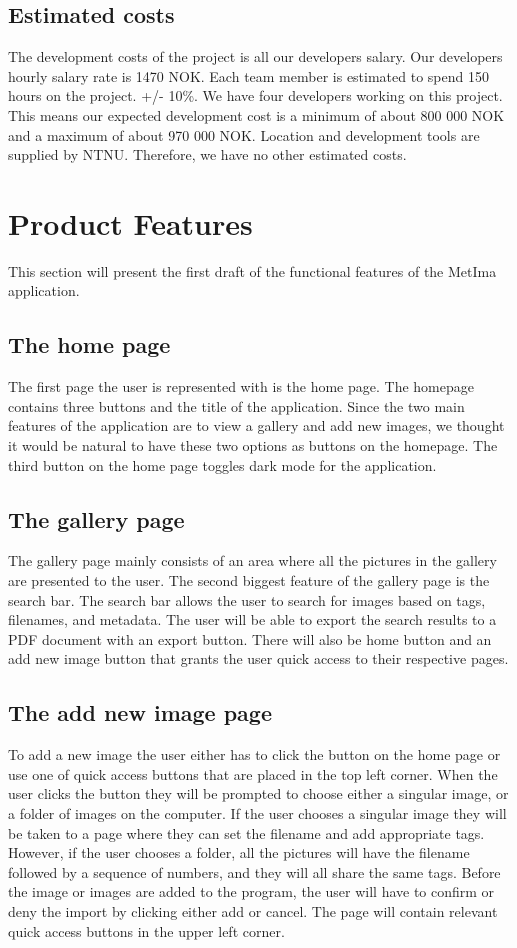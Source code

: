 \documentclass{article}
\begin{document}
\subsection{Estimated costs}
The development costs of the project is all our developers salary. Our developers hourly salary rate is 1470 NOK.
Each team member is estimated to spend 150 hours on the project. +/- 10\%.
We have four developers working on this project. This means our expected development cost is a minimum of about 800 000 NOK and a maximum of about 970 000 NOK. 
Location and development tools are supplied by NTNU. Therefore, we have no other estimated costs.


\section{Product Features}
This section will present the first draft of the functional features of the MetIma application.

\subsection{The home page}
The first page the user is represented with is the home page. The homepage contains three buttons and the title of the application. Since the two main features of the application are to view a gallery and add new images, we thought it would be natural to have these two options as buttons on the homepage. The third button on the home page toggles dark mode for the application.

\subsection{The gallery page}
The gallery page mainly consists of an area where all the pictures in the gallery are presented to the user. The second biggest feature of the gallery page is the search bar. The search bar allows the user to search for images based on tags, filenames, and metadata. The user will be able to export the search results to a PDF document with an export button. There will also be home button and an add new image button that grants the user quick access to their respective pages.

\subsection{The add new image page}
 To add a new image the user either has to click the button on the home page or use one of quick access buttons that are placed in the top left corner. When the user clicks the button they will be prompted to choose either a singular image, or a folder of images on the computer. If the user chooses a singular image they will be taken to a page where they can set the filename and add appropriate tags. However, if the user chooses a folder, all the pictures will have the filename followed by a sequence of numbers, and they will all share the same tags. Before the image or images are added to the program, the user will have to confirm or deny the import by clicking either add or cancel. The page will contain relevant quick access buttons in the upper left corner. 
\end{document}
